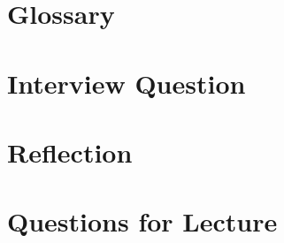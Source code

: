\documentclass[12pt]{article}
\begin{document}
\section{Glossary}

\section{Interview Question}

\section{Reflection}

\section{Questions for Lecture}



\end{document}
